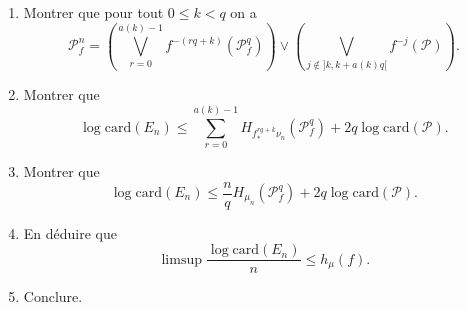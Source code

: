 \documentclass[a4paper,12pt,openany]{article}
\theoremstyle{plain}
\theoremstyle{definition}
\newcommand{\Pcal}{\mathcal{P}}
\begin{document}
\begin{enumerate}[resume]
\item Montrer que pour tout $0 \leqslant k < q$ on a 
$$
\Pcal_f^n = \left( \bigvee_{r=0}^{a(k) - 1} f^{-(rq + k)}(\Pcal_f^q) \right) \vee \left( \bigvee_{j \notin ]k, k+a(k)q[} f^{-j}(\Pcal)\right).
$$
\item Montrer que
$$
\log \mathrm{card}(E_n) \leqslant \sum_{r=0}^{a(k)-1} H_{f_*^{rq+k}\nu_n}(\Pcal_f^q) + 2q \log \mathrm{card}(\Pcal).
$$
\item Montrer que 
$$
\log \mathrm{card}(E_n) \leqslant \frac{n}{q} H_{\mu_n} (\Pcal_f^q) + 2q \log \mathrm{card}(\Pcal).
$$
\item En d\'eduire que 
$$
\limsup \frac{\log \mathrm{card}(E_n)}{n} \leqslant h_\mu(f).
$$
\item Conclure.
\end{enumerate}
\vspace{0.6cm}



 
\end{document}
